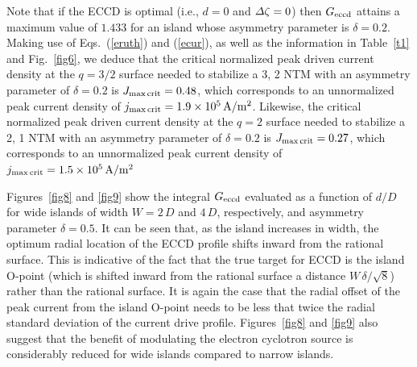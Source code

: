 \documentclass[12pt,prb,aps]{revtex4-1}
\begin{document}
Note that if the ECCD is optimal
(i.e., $d=0$ and ${\mit\Delta}\zeta=0$) then $G_{\rm eccd}$ attains a maximum value of $1.433$ for an island whose asymmetry parameter is $\delta=0.2$. 
Making use of Eqs.~(\ref{eruth}) and (\ref{ecur}),  as well as the information in Table~\ref{t1} and Fig.~\ref{fig6}, 
we deduce that the critical normalized peak driven current density at the $q=3/2$ surface needed to stabilize a 3, 2 NTM with an asymmetry parameter of $\delta = 0.2$ is $J_{\rm max\,crit}= 0.48$, which corresponds
to an unnormalized peak current density of $j_{\rm max\,crit}= 1.9\times 10^5\,{\rm A/m^2}$. Likewise, the critical normalized peak driven current density at the $q=2$ surface needed to stabilize a 2, 1 NTM with an asymmetry parameter of $\delta = 0.2$ is $J_{\rm max\,crit}= 0.27$, which corresponds
to an unnormalized peak current density of $j_{\rm max\,crit}= 1.5\times 10^5\,{\rm A/m^2}$

Figures~\ref{fig8} and \ref{fig9} show the integral $G_{\rm eccd}$ evaluated  as a function of $d/D$ for wide islands of width $W=2\,D$ and $4\,D$, respectively, and asymmetry parameter
$\delta=0.5$. It can be seen that, as the island increases in width, the optimum radial location of the ECCD profile shifts inward from the rational
surface.\cite{ece6} This is indicative of the fact that the true target for ECCD is the island O-point (which is shifted inward from the
rational surface a distance $W\,\delta/\sqrt{8}$) rather than the rational surface. It is again the case that the radial offset of the peak current from the island
O-point needs to be less that twice the radial standard deviation of the current drive profile. 
Figures~\ref{fig8} and \ref{fig9}  also suggest that the benefit of modulating the
electron cyclotron source is considerably reduced for wide islands compared to narrow islands. 
\end{document}
